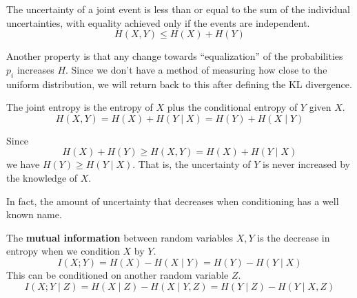 \documentclass{article}
\begin{document}
    \begin{theorem}
      The uncertainty of a joint event is less than or equal to the sum of the individual uncertainties, with equality achieved only if the events are independent. 
      \begin{equation}
        H(X, Y) \leq H(X) + H(Y)
      \end{equation}
    \end{theorem}

    Another property is that any change towards ``equalization'' of the probabilities $p_i$ increases $H$. Since we don't have a method of measuring how close to the uniform distribution, we will return back to this after defining the KL divergence.  

    \begin{theorem}
      The joint entropy is the entropy of $X$ plus the conditional entropy of $Y$ given $X$. 
      \begin{equation}
        H(X, Y) = H(X) + H(Y \mid X) = H(Y) + H(X \mid Y)
      \end{equation}
    \end{theorem}

    \begin{theorem}
      Since 
      \begin{equation}
        H(X) + H(Y) \geq H(X, Y) = H(X) + H(Y \mid X)
      \end{equation}
      we have $H(Y) \geq H(Y \mid X)$. That is, the uncertainty of $Y$ is never increased by the knowledge of $X$. 
    \end{theorem}

    In fact, the amount of uncertainty that decreases when conditioning has a well known name. 

    \begin{definition}
      The \textbf{mutual information} between random variables $X, Y$ is the decrease in entropy when we condition $X$ by $Y$. 
      \begin{equation}
        I(X ; Y) = H(X) - H(X \mid Y) = H(Y) - H(Y \mid X)
      \end{equation}
      This can be conditioned on another random variable $Z$. 
      \begin{equation}
        I(X ; Y \mid Z) = H(X \mid Z) - H(X \mid Y, Z) = H(Y \mid Z) - H(Y \mid X, Z)
      \end{equation}
    \end{definition}
    
\end{document}
